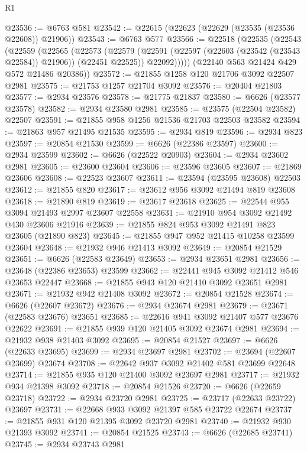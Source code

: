 \begin{lexlean}{R1}
\begin{coremodule}
@23536 := @6763 @581
@23542 := @22615 (@22623 (@22629 (@23535 (@23536 @22608)) @21906))
@23543 := @6763 @577
@23566 := @22518
    (@22535
      (@22543
        (@22559
          (@22565
            (@22573
              (@22579
                (@22591 (@22597 (@22603 (@23542 (@23543 @22584)) @21906)) (@22451 @22525))
                @22092)))))
      (@22140 @563 @21424 @429 @572 @21486 @20386))
@23572 := @21855 @1258 @120 @21706 @3092 @22507 @2981
@23575 := @21753 @1257 @21704 @3092
@23576 := @20404 @21803
@23577 := @2934 @23576
@23578 := @21775 @21837
@23580 := @6626 (@23577 @23578)
@23582 := @2934 @23580 @2981
@23585 := @23575 (@22504 @23582) @22507
@23591 := @21855 @958 @1256 @21536 @21703 @22503 @23582
@23594 := @21863 @957 @21495 @21535
@23595 := @2934 @819
@23596 := @2934 @823
@23597 := @20854 @21530
@23599 := @6626 (@22386 @23597)
@23600 := @2934 @23599
@23602 := @6626 (@22522 @20903)
@23604 := @2934 @23602 @2981
@23605 := @23600 @23604
@23606 := @23596 @23605
@23607 := @21869 @23606
@23608 := @22523 @23607
@23611 := @23594 (@23595 @23608) @22503
@23612 := @21855 @820
@23617 := @23612 @956 @3092 @21494 @819 @23608
@23618 := @21890 @819
@23619 := @23617 @23618
@23625 := @22544 @955 @3094 @21493 @2997 @23607 @22558
@23631 := @21910 @954 @3092 @21492 @430 @23606 @21916
@23639 := @21855 @824 @953 @3092 @21491 @823 @23605 (@21890 @823)
@23645 := @21855 @947 @952 @21415 @10258 @23599 @23604
@23648 := @21932 @946 @21413 @3092
@23649 := @20854 @21529
@23651 := @6626 (@22583 @23649)
@23653 := @2934 @23651 @2981
@23656 := @23648 (@22386 @23653) @23599
@23662 := @22441 @945 @3092 @21412 @546 @23653 @22447
@23668 := @21855 @943 @120 @21410 @3092 @23651 @2981
@23671 := @21932 @942 @21408 @3092
@23672 := @20854 @21528
@23674 := @6626 (@22607 @23672)
@23676 := @2934 @23674 @2981
@23679 := @23671 (@22583 @23676) @23651
@23685 := @22616 @941 @3092 @21407 @577 @23676 @22622
@23691 := @21855 @939 @120 @21405 @3092 @23674 @2981
@23694 := @21932 @938 @21403 @3092
@23695 := @20854 @21527
@23697 := @6626 (@22633 @23695)
@23699 := @2934 @23697 @2981
@23702 := @23694 (@22607 @23699) @23674
@23708 := @22642 @937 @3092 @21402 @581 @23699 @22648
@23714 := @21855 @935 @120 @21400 @3092 @23697 @2981
@23717 := @21932 @934 @21398 @3092
@23718 := @20854 @21526
@23720 := @6626 (@22659 @23718)
@23722 := @2934 @23720 @2981
@23725 := @23717 (@22633 @23722) @23697
@23731 := @22668 @933 @3092 @21397 @585 @23722 @22674
@23737 := @21855 @931 @120 @21395 @3092 @23720 @2981
@23740 := @21932 @930 @21393 @3092
@23741 := @20854 @21525
@23743 := @6626 (@22685 @23741)
@23745 := @2934 @23743 @2981

\end{coremodule}
\end{lexlean}
